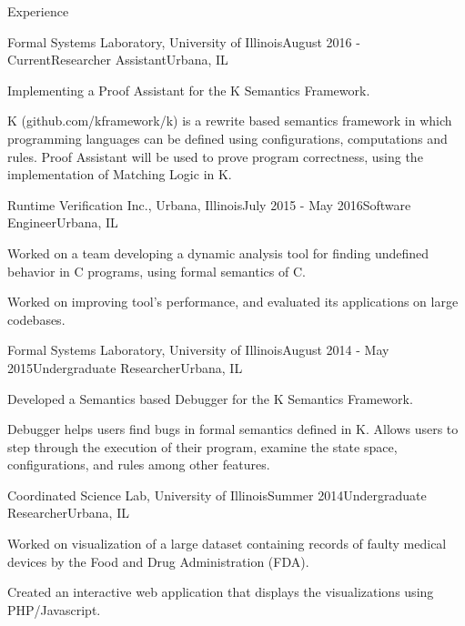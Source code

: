 \documentclass{resume} %
\begin{document}
\begin{rSection}{Experience}

\begin{rSubsection}{Formal Systems Laboratory, University of Illinois}{August 2016 - Current}{Researcher Assistant}{Urbana, IL}
\item Implementing a Proof Assistant for the K Semantics Framework.
\item K (github.com/kframework/k) is a rewrite based semantics framework in which programming
languages can be defined using configurations, computations and rules. Proof Assistant will be used to prove program correctness, using the implementation of Matching Logic in K.
\end{rSubsection}

\begin{rSubsection}{Runtime Verification Inc., Urbana, Illinois}{July 2015 - May 2016}{Software Engineer}{Urbana, IL}
\item Worked on a team developing a dynamic analysis tool for finding undefined behavior in C programs, using formal semantics of C.
\item Worked on improving tool's performance, and evaluated its applications on large codebases.
\end{rSubsection}

\begin{rSubsection}{Formal Systems Laboratory, University of Illinois}{August 2014 - May 2015}{Undergraduate Researcher}{Urbana, IL}
\item Developed a Semantics based Debugger for the K Semantics Framework.
\item Debugger helps users find bugs in formal semantics defined in K. Allows users to step
through the execution of their program, examine the state space, configurations, and rules
among other features.
\end{rSubsection}

\begin{rSubsection}{Coordinated Science Lab, University of Illinois}{Summer 2014}{Undergraduate Researcher}{Urbana, IL}
\item Worked on visualization of a large dataset containing records of faulty medical devices by the Food and Drug Administration (FDA).
\item Created an interactive web application that displays the visualizations using PHP/Javascript.
\end{rSubsection}


\end{rSection}
\end{document}
